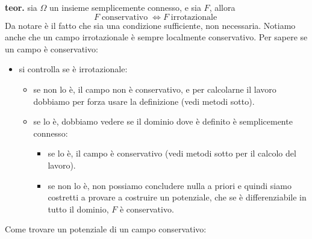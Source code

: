 \newline
\textbf{teor.} sia $\Omega$ un insieme semplicemente connesso, e sia $F$, allora
\[
    F \; \text{conservativo}\; \Longleftrightarrow F \; \text{irrotazionale}\;
\]
Da notare è il fatto che sia una condizione sufficiente, non necessaria.\newline
Notiamo anche che un campo irrotazionale è sempre localmente conservativo.\newline
\newline
Per sapere se un campo è conservativo:
\begin{itemize}
    \item si controlla se è irrotazionale:
    \begin{itemize}
        \item se non lo è, il campo non è conservativo, e per calcolarne il lavoro dobbiamo per forza usare la definizione (vedi metodi sotto).
        \item se lo è, dobbiamo vedere se il dominio dove è definito è semplicemente connesso:
        \begin{itemize}
            \item se lo è, il campo è conservativo (vedi metodi sotto per il calcolo del lavoro).
            \item se non lo è, non possiamo concludere nulla a priori e quindi siamo costretti a provare a costruire un potenziale, che se è differenziabile in tutto il dominio, $F$ è conservativo.
        \end{itemize}
    \end{itemize}
\end{itemize}
Come trovare un potenziale di un campo conservativo:
